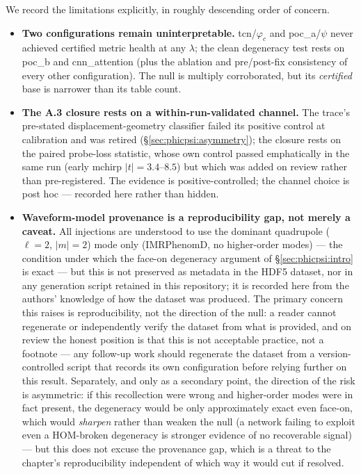 We record the limitations explicitly, in roughly descending order of concern.
\begin{itemize}
\item \textbf{Two configurations remain uninterpretable.} tcn/$\varphi_c$ and poc\_a/$\psi$ never achieved certified metric health at any $\lambda$; the clean degeneracy test rests on poc\_b and cnn\_attention (plus the ablation and pre/post-fix consistency of every other configuration).
The null is multiply corroborated, but its \emph{certified} base is narrower than its table count.
\item \textbf{The A.3 closure rests on a within-run-validated channel.}
The trace's pre-stated displacement-geometry classifier failed its positive control at calibration and was retired (\S\ref{sec:phicpsi:asymmetry}); the closure rests on the paired probe-loss statistic, whose own control passed emphatically in the same run (early mchirp $|t| = 3.4$--$8.5$) but which was added on review rather than pre-registered.
The evidence is positive-controlled; the channel choice is post hoc --- recorded here rather than hidden.
\item \textbf{Waveform-model provenance is a reproducibility gap, not merely a caveat.}
All injections are understood to use the dominant quadrupole ($\ell=2$, $|m|=2$) mode only (IMRPhenomD, no higher-order modes) --- the condition under which the face-on degeneracy argument of \S\ref{sec:phicpsi:intro} is exact --- but this is not preserved as metadata in the HDF5 dataset, nor in any generation script retained in this repository; it is recorded here from the authors' knowledge of how the dataset was produced.
The primary concern this raises is reproducibility, not the direction of the null: a reader cannot regenerate or independently verify the dataset from what is provided, and on review the honest position is that this is not acceptable practice, not a footnote --- any follow-up work should regenerate the dataset from a version-controlled script that records its own configuration before relying further on this result.
Separately, and only as a secondary point, the direction of the risk is asymmetric: if this recollection were wrong and higher-order modes were in fact present, the degeneracy would be only approximately exact even face-on, which would \emph{sharpen} rather than weaken the null (a network failing to exploit even a HOM-broken degeneracy is stronger evidence of no recoverable signal) --- but this does not excuse the provenance gap, which is a threat to the chapter's reproducibility independent of which way it would cut if resolved.

\end{itemize}
